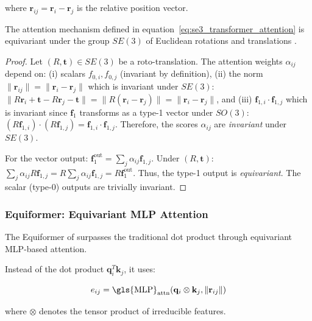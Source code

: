 where $\mathbf{r}_{ij} = \mathbf{r}_i - \mathbf{r}_j$ is the relative position vector.

\begin{theorem}
    The attention mechanism defined in equation~\eqref{eq:se3_transformer_attention} is equivariant under the group $SE(3)$ of Euclidean rotations and translations \citep{fuchs2020se3transformers}.
\end{theorem}

\begin{proof}
Let $(R, \mathbf{t}) \in SE(3)$ be a roto-translation. The attention weights $\alpha_{ij}$ depend on: (i) scalars $f_{0,i}, f_{0,j}$ (invariant by definition), (ii) the norm $\|\mathbf{r}_{ij}\| = \|\mathbf{r}_i - \mathbf{r}_j\|$ which is invariant under $SE(3)$: $\|R\mathbf{r}_i + \mathbf{t} - R\mathbf{r}_j - \mathbf{t}\| = \|R(\mathbf{r}_i - \mathbf{r}_j)\| = \|\mathbf{r}_i - \mathbf{r}_j\|$, and (iii) $\mathbf{f}_{1,i} \cdot \mathbf{f}_{1,j}$ which is invariant since $\mathbf{f}_1$ transforms as a type-1 vector under $SO(3)$: $(R\mathbf{f}_{1,i}) \cdot (R\mathbf{f}_{1,j}) = \mathbf{f}_{1,i} \cdot \mathbf{f}_{1,j}$. Therefore, the scores $\alpha_{ij}$ are \emph{invariant} under $SE(3)$.

For the vector output: $\mathbf{f}_1^{\text{out}} = \sum_j \alpha_{ij} \mathbf{f}_{1,j}$. Under $(R, \mathbf{t})$: $\sum_j \alpha_{ij} R\mathbf{f}_{1,j} = R \sum_j \alpha_{ij} \mathbf{f}_{1,j} = R \mathbf{f}_1^{\text{out}}$. Thus, the type-1 output is \emph{equivariant}. The scalar (type-0) outputs are trivially invariant.
\end{proof}

\subsubsection{Equiformer: Equivariant \gls{MLP} Attention}

The Equiformer of \citet{liao2022equiformer} surpasses the traditional dot product through equivariant \gls{MLP}-based attention.

Instead of the dot product $\mathbf{q}_i^T \mathbf{k}_j$, it uses:

\begin{equation}
    e_{ij} = \text{\gls{MLP}}_{\text{attn}}(\mathbf{q}_i \otimes \mathbf{k}_j, \|\mathbf{r}_{ij}\|)
    \label{eq:equiformer_attention_scores}
\end{equation}

where $\otimes$ denotes the tensor product of irreducible features.


